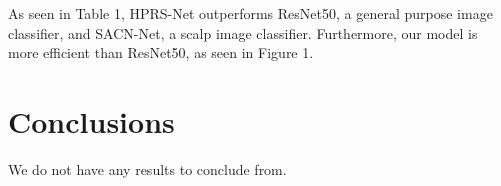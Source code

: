 \documentclass[10pt,twocolumn,letterpaper]{article}
\begin{document}
As seen in Table 1, HPRS-Net outperforms ResNet50, a general purpose image classifier, and SACN-Net, a scalp image classifier. Furthermore, our model is more efficient than ResNet50, as seen in Figure 1.
\section{Conclusions}
We do not have any results to conclude from.
{\small
\nocite{*}


}
\end{document}
